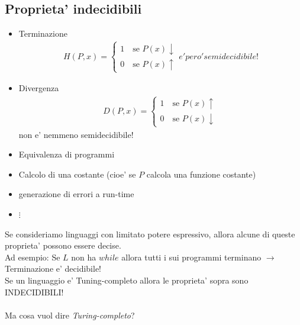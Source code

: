 \documentclass[a4paper,12pt]{article}
\begin{document}
{\subsection{Proprieta' indecidibili}
\begin{itemize}
  \item Terminazione 
  \begin{align*}
    H(P,x) = \begin{cases}
      1 \quad \text{se } P(x)\downarrow \\
      0 \quad \text{se } P(x) \uparrow
    \end{cases}
    e' pero' semidecidibile!
  \end{align*}
  \item Divergenza
  \begin{align*}
    D(P,x) = \begin{cases}
      1 \quad \text{se } P(x) \uparrow \\
      0 \quad \text{se } P(x) \downarrow
    \end{cases}
  \end{align*}
  non e' nemmeno semidecidibile!
  \item Equivalenza di programmi
  \item Calcolo di una costante (cioe' se $P$ calcola una funzione costante)
  \item generazione di errori a run-time
  \item $\vdots$
\end{itemize}
Se consideriamo linguaggi con limitato potere espressivo, allora alcune di queste proprieta' possono essere decise. \\
Ad esempio: Se $L$ non ha $while$ allora tutti i sui programmi terminano $\to$ Terminazione e' decidibile! \\
Se un linguaggio e' Tuning-completo allora le proprieta' sopra sono INDECIDIBILI! \\
\vspace{5px}\\
Ma cosa vuol dire \textit{Turing-completo}? \\
\vspace{1em}
}
\end{document}
